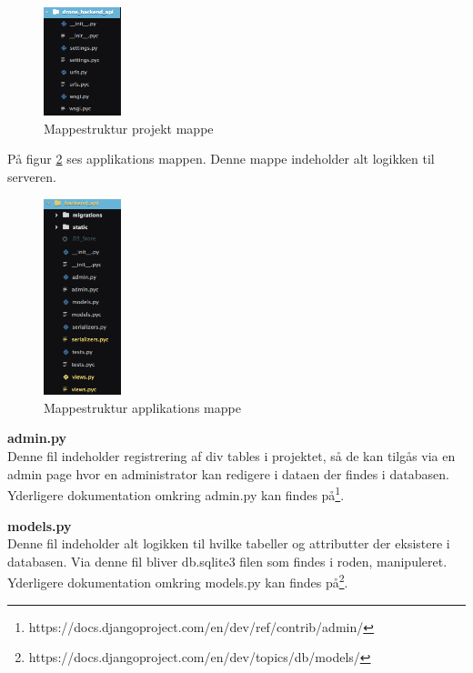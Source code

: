 \begin{figure}[H]
	\centering
	\includegraphics[width=0.2\textwidth]{Billeder/implementation/mappestruktur_2.png}
	\caption{Mappestruktur projekt mappe}
	\label{fig:mappestruktur_2}
\end{figure}

På figur \ref{fig:mappestruktur_3} ses applikations mappen. Denne mappe indeholder alt logikken til serveren.

\begin{figure}[H]
	\centering
	\includegraphics[width=0.2\textwidth]{Billeder/implementation/mappestruktur_3.png}
	\caption{Mappestruktur applikations mappe}
	\label{fig:mappestruktur_3}
\end{figure}

\textbf{admin.py} \\
Denne fil indeholder registrering af div tables i projektet, så de kan tilgås via en admin page hvor en administrator kan redigere i dataen der findes i databasen. Yderligere dokumentation omkring admin.py kan findes på\footnote{https://docs.djangoproject.com/en/dev/ref/contrib/admin/}.

\textbf{models.py} \\
Denne fil indeholder alt logikken til hvilke tabeller og attributter der eksistere i databasen. Via denne fil bliver db.sqlite3 filen som findes i roden, manipuleret. Yderligere dokumentation omkring models.py kan findes på\footnote{https://docs.djangoproject.com/en/dev/topics/db/models/}.

